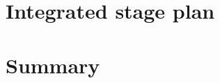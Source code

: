 \documentclass[twocolumn]{article}
\begin{document}
\section{Integrated stage plan}

\section{Summary}



\end{document}
